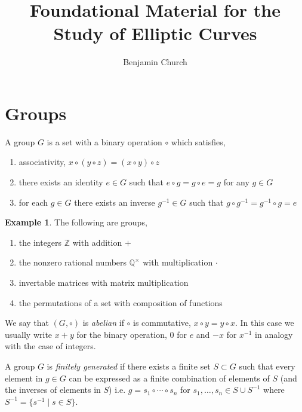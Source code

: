 \documentclass{article}
\title{Foundational Material for the Study of Elliptic Curves}
\author{Benjamin Church}
\newcommand{\Z}{\mathbb{Z}}
\newcommand{\Q}{\mathbb{Q}}
\theoremstyle{definition}
\newtheorem{example}[theorem]{Example}
\newenvironment{definition}[1][Definition:]{\begin{trivlist}
\item[\hskip \labelsep {\bfseries #1}]}{\end{trivlist}}
\begin{document}
\maketitle

\tableofcontents

\newpage

\section{Groups}

\begin{definition}
A group $G$ is a set with a binary operation $\circ$ which satisfies,
\begin{enumerate}
\item associativity, $x \circ (y \circ z) = (x \circ y) \circ z$
\item there exists an identity $e \in G$ such that $e \circ g = g \circ e = g$ for any $g \in G$
\item for each $g \in G$ there exists an inverse $g^{-1} \in G$ such that $g \circ g^{-1} = g^{-1} \circ g = e$
\end{enumerate} 
\end{definition}

\begin{example}
The following are groups,
\begin{enumerate}
\item the integers $\Z$ with addition $+$
\item the nonzero rational numbers $\Q^\times$ with multiplication $\cdot$
\item invertable matrices with matrix multiplication
\item the permutations of a set with composition of functions
\end{enumerate}
\end{example}

\begin{definition}
We say that $(G, \circ)$ is \textit{abelian} if $\circ$ is commutative, $x \circ y = y \circ x$. In this case we usually write $x + y$ for the binary operation, $0$ for $e$ and $-x$ for $x^{-1}$ in analogy with the case of integers. 
\end{definition}

\begin{definition}
A group $G$ is \textit{finitely generated} if there exists a finite set $S \subset G$ such that every element in $g \in G$ can be expressed as a finite combination of elements of $S$ (and the inverses of elements in $S$) i.e. $g = s_1 \circ \cdots \circ s_n$ for $s_1, \dots, s_n \in S \cup S^{-1}$ where $S^{-1} = \{ s^{-1} \mid s \in S \}$.
\end{definition}
\end{document}
